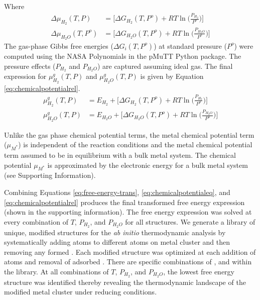 \documentclass[journal=jctcce,manuscript=article]{achemso}
\begin{document}
Where
\begin{equation}
    \begin{split}
        \Delta \mu_{H_{2}}(T,P) &= \Big[ \Delta G_{H_{2}}(T,P^{o}) + RT \ln{\Big( \frac{P_{H_{2}}}{P^{o}} \Big)} \Big] \\
        \Delta \mu_{H_{2}O}(T,P^{o}) &=  \Big[ \Delta G_{H_{2}O}(T,P^{o}) + RT \ln{\Big( \frac{P_{H_{2}O}}{P^{o}} \Big)} \Big]
    \end{split}
\end{equation}
The gas-phase Gibbs free energies ($\Delta G_{i}(T,P^{o})$) at standard pressure ($P^{o}$) were computed using the NASA Polynomials\cite{Mcbride1993} in the pMuTT\cite{LYM2019106864} Python package. The pressure effects ($P_{H_{2}}$ and $P_{H_{2}O}$) are captured assuming ideal gas. The final expression for $\mu_{H_{2}}^{g}(T,P)$ and $\mu_{H_{2}O}^{g}(T,P)$ is given by Equation \ref{eq:chemicalpotentialrel}. 
\begin{equation}
    \begin{split}
        \mu_{H_{2}}^{g}(T,P) &=  E_{H_{2}} + \Big[ \Delta G_{H_{2}}(T,P^{o}) + RT \ln{\Big( \frac{P_{H_{2}}}{P^{o}} \Big)} \Big] \\  
        \mu_{H_{2}O}^{g}(T,P) &=  E_{H_{2}O} + \Big[ \Delta G_{H_{2}O}(T,P^{o}) + RT \ln{\Big( \frac{P_{H_{2}O}}{P^{o}} \Big)} \Big]
    \end{split}
    \label{eq:chemicalpotentialrel}
\end{equation}

Unlike the gas phase chemical potential terms, the metal chemical potential term ($\mu_{M^{*}}$) is independent of the reaction conditions and the metal chemical potential term assumed to be in equilibrium with a bulk metal system. The chemical potential $\mu_{M^{*}}$ is approximated by the electronic energy for a bulk metal system (see Supporting Information). 

Combining Equations \ref{eq:free-energy-trans}, \ref{eq:chemicalpotentialeq}, and \ref{eq:chemicalpotentialrel} produces the final transformed free energy expression (shown in the supporting information). The free energy expression was solved at every combination of $T$, $P_{H_2}$, and $P_{H_{2}O}$ for all structures. We generate a library of unique, modified structures for the \textit{ab initio} thermodynamic analysis by systematically adding  atoms to different atoms on metal cluster and then removing any formed . Each modified structure was optimized at each addition of  atoms and removal of adsorbed . There are specific combinations of ,  and  within the library. At all combinations of $T$, $P_{H_2}$, and $P_{H_{2}O}$, the lowest free energy structure was identified thereby revealing the thermodynamic landscape of the modified metal cluster under reducing conditions. 
\end{document}
